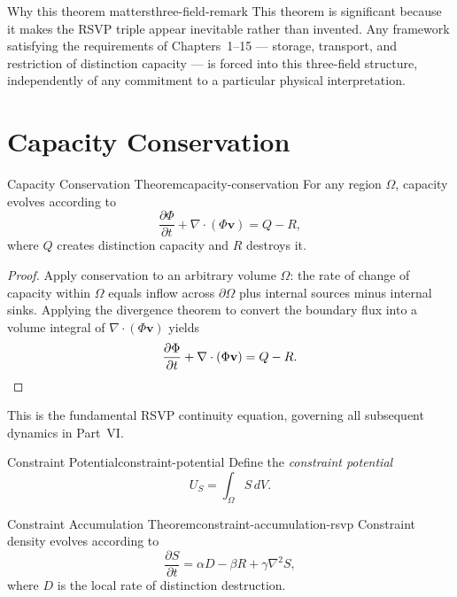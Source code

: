 \documentclass[12pt,twoside,openright]{book}
\begin{document}
\begin{remark}{Why this theorem matters}{three-field-remark}
  This theorem is significant because it makes the RSVP
  triple appear inevitable rather than invented. Any
  framework satisfying the requirements of
  Chapters~1--15 --- storage, transport, and restriction of
  distinction capacity --- is forced into this three-field
  structure, independently of any commitment to a
  particular physical interpretation.
\end{remark}

\section{Capacity Conservation}
\label{sec:ch16-conservation}

\begin{theorem}{Capacity Conservation Theorem}{capacity-conservation}
  For any region $\Omega$, capacity evolves according to
  \[
    \frac{\partial \Phi}{\partial t}
    + \nabla\cdot(\Phi\mathbf{v})
    = Q - R,
  \]
  where $Q$ creates distinction capacity and $R$ destroys it.
\end{theorem}

\begin{proof}
  Apply conservation to an arbitrary volume $\Omega$: the
  rate of change of capacity within $\Omega$ equals inflow
  across $\partial\Omega$ plus internal sources minus
  internal sinks. Applying the divergence theorem to convert
  the boundary flux into a volume integral of
  $\nabla\cdot(\Phi\mathbf{v})$ yields
  \[
    \frac{\partial \Phi}{\partial t}
    + \nabla\cdot(\Phi\mathbf{v})
    = Q - R. \qedhere
  \]
\end{proof}

This is the fundamental RSVP continuity equation, governing
all subsequent dynamics in Part~VI.

\begin{definition}{Constraint Potential}{constraint-potential}
  Define the \emph{constraint potential}
  \[
    U_S = \int_\Omega S \, dV.
  \]
\end{definition}

\begin{theorem}{Constraint Accumulation Theorem}{constraint-accumulation-rsvp}
  Constraint density evolves according to
  \[
    \frac{\partial S}{\partial t}
    = \alpha D - \beta R + \gamma \nabla^2 S,
  \]
  where $D$ is the local rate of distinction destruction.
\end{theorem}
\end{document}
